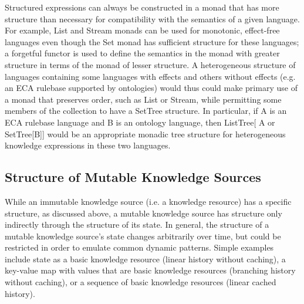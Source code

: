 \documentclass[runningheads]{llncs}
\begin{document}
Structured expressions can always be constructed in a monad that has more structure than necessary for compatibility with the semantics of a given language.
For example, List and Stream monads can be used for monotonic, effect-free languages even though the Set monad has sufficient structure for these languages;
a forgetful functor is used to define the semantics in the monad with greater structure in terms of the monad of lesser structure.
A heterogeneous structure of languages containing some languages with effects and others without effects (e.g. an ECA rulebase supported by ontologies) would thus could make primary use of a monad that preserves order, such as List or Stream, while permitting some members of the collection to have a SetTree structure. In particular, if A is an ECA rulebase language and B is an ontology language, then ListTree[ A or SetTree[B]] would be an appropriate monadic tree structure for heterogeneous knowledge expressions in these two languages. 



\subsection{Structure of Mutable Knowledge Sources}
While an immutable knowledge source (i.e. a knowledge resource) has a specific structure, as discussed above, a mutable knowledge source has structure only indirectly through the structure of its state. In general, the structure of a mutable knowledge source's state changes arbitrarily over time, but could be restricted in order to emulate common dynamic patterns. Simple examples include state as a basic knowledge resource (linear history without caching), a key-value map with values that are basic knowledge resources (branching history without caching), or a sequence of basic knowledge resources (linear cached history). 


\end{document}
